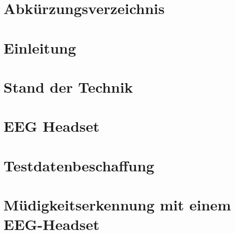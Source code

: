 
\graphicspath{{img/}{./}}


\pagestyle{empty}





\cleardoublepage 
\begingroup
\let\clearpage\relax

\chapter*{Abkürzungsverzeichnis}

%
\endgroup


\pagestyle{WissDokuNorm}

\cleardoublepage


\cleardoublepage
\chapter{Einleitung}


\chapter{Stand der Technik}


\chapter{EEG Headset}


\chapter{Testdatenbeschaffung}


\chapter{Müdigkeitserkennung mit einem EEG-Headset}


